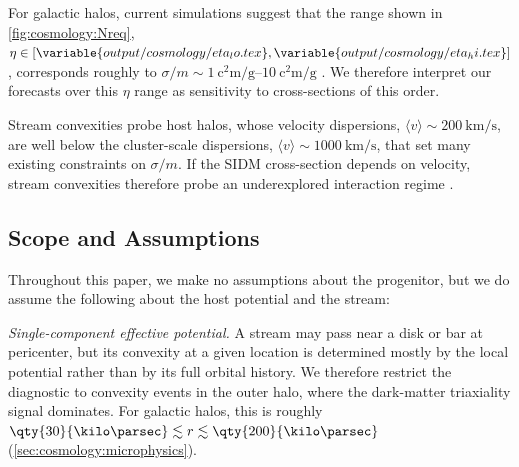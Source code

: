 \documentclass[linenumbers,twocolumn]{aastex701}
\begin{document}
        For galactic halos, current simulations suggest that the range shown in \cref{fig:cosmology:Nreq}, $\eta\in[\variable{output/cosmology/eta_lo.tex},\variable{output/cosmology/eta_hi.tex}]$, corresponds roughly to $\sigma/m\sim\qtyrange{1}{10}{\square\centi\meter\per\gram}$ \citep{Vargya+:2022:ShapesMilkyWayMassGalaxies,Brinckmann+:2018:StructureAssemblyHistory,Fischer+:2024:CosmologicalIdealizedSimulations,Sameie+:2021:CentralDensitiesMilky}. %
        We therefore interpret our forecasts over this $\eta$ range as sensitivity to cross-sections of this order. %

        Stream convexities probe host halos, whose velocity dispersions, $\langle v\rangle\sim\qty{200}{\kilo\meter\per\second}$, are well below the cluster-scale dispersions, $\langle v\rangle\sim\qty{1000}{\kilo\meter\per\second}$, that set many existing constraints on $\sigma/m$. %
        If the \gls{SIDM} cross-section depends on velocity, stream convexities therefore probe an underexplored interaction regime \citep{Tulin+Yu:2018:DarkMatterSelfinteractions,Adhikari+:2025:AstrophysicalTestsDark}. %



    \subsection{Scope and Assumptions}\label{sec:discussion:assumptions}

        Throughout this paper, we make no assumptions about the progenitor, but we do assume the following about the host potential and the stream: %

        \emph{Single-component effective potential.} %
        A stream may pass near a disk or bar at pericenter, but its convexity at a given location is determined mostly by the local potential rather than by its full orbital history. %
        We therefore restrict the diagnostic to convexity events in the outer halo, where the dark-matter triaxiality signal dominates. %
        For galactic halos, this is roughly $\qty{30}{\kilo\parsec} \lesssim r \lesssim \qty{200}{\kilo\parsec}$ (\autoref{sec:cosmology:microphysics}). %
\end{document}
